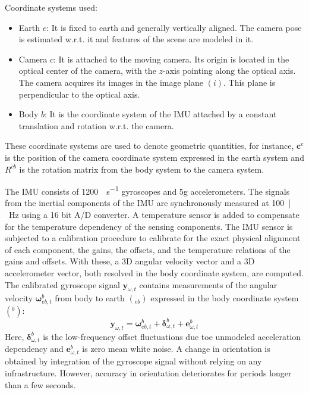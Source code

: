 Coordinate systems used:
\begin{itemize}
	\item Earth $ e $: It is fixed to earth and generally vertically aligned.  The camera pose is estimated w.r.t. it and features of the scene are modeled in it.
	\item Camera $ c $: It is attached to the moving camera. Its origin is 	located in the optical center of the camera, with the $ z $-axis pointing along the optical axis. The camera acquires its images in the image plane $ (i) $. This plane is perpendicular to the optical axis.
	\item Body $ b $: It is the coordinate system of the IMU attached by a constant translation and rotation w.r.t. the camera.
\end{itemize}

These coordinate systems are used to denote geometric quantities, for instance, $ \bm{c}^e $ is the position of the camera coordinate system expressed in the earth system and $ R^{cb} $ is the rotation matrix from the body system to the camera system.

The IMU consists of \SI{1200}{\deg\per\s} gyroscopes and 5g accelerometers. The signals from the inertial components of the IMU are synchronously measured at \SI{100}{|\Hz} using a 16 bit A/D converter. A temperature sensor is added to compensate for the temperature dependency of the sensing components. The IMU sensor is subjected to a calibration procedure to calibrate for the exact physical alignment of each component, the gains, the offsets, and the temperature relations of the gains and offsets. With these, a 3D angular velocity vector and a 3D accelerometer vector, both resolved in the body coordinate system, are computed. The calibrated gyroscope signal $ \bm{y}_{\omega,t} $ contains measurements of the angular velocity $ \bm{\omega}^b_{eb,t} $ from body to earth $ ( _{eb} ) $ expressed in the body coordinate system $ ( ^b ) $:
\begin{equation}
\bm{y}_{\omega,t} = \bm{\omega}^b_{eb,t} + \bm{\delta}^b_{\omega,t} + \bm{e}^b_{\omega,t}
\end{equation}
Here, $ \bm{\delta}^b_{\omega,t} $ is the low-frequency offset fluctuations due toe unmodeled acceleration dependency and $ \bm{e}^b_{\omega,t} $ is zero mean white noise. A change in orientation is obtained by integration of the gyroscope signal without relying on any infrastructure. However, accuracy in orientation deteriorates for periods longer than a few seconds. 


